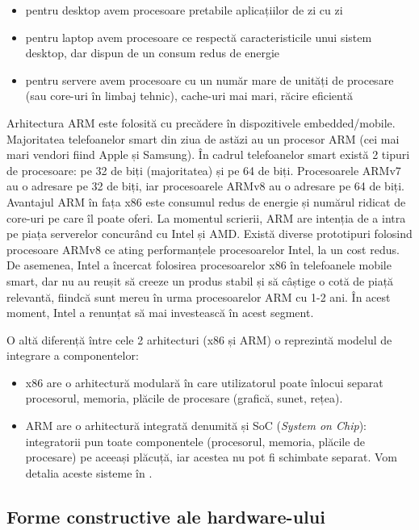\begin{itemize}
  \item pentru desktop avem procesoare pretabile aplicațiilor de zi cu zi
  \item pentru laptop avem procesoare ce respectă caracteristicile unui sistem desktop, dar dispun de un consum redus de energie
  \item pentru servere avem procesoare cu un număr mare de unități de procesare (sau core-uri în limbaj tehnic), cache-uri mai mari, răcire eficientă
\end{itemize}

Arhitectura ARM este folosită cu precădere în dispozitivele embedded/mobile.
Majoritatea telefoanelor smart din ziua de astăzi au un procesor ARM (cei mai mari vendori fiind Apple și Samsung).
În cadrul telefoanelor smart există 2 tipuri de procesoare: pe 32 de biți (majoritatea) și pe 64 de biți.
Procesoarele ARMv7 au o adresare pe 32 de biți, iar procesoarele ARMv8 au o adresare pe 64 de biți.
Avantajul ARM în fața x86 este consumul redus de energie și numărul ridicat de core-uri pe care îl poate oferi.
La momentul scrierii, ARM are intenția de a intra pe piața serverelor concurând cu Intel și AMD.
Există diverse prototipuri folosind procesoare ARMv8 ce ating performanțele procesoarelor Intel, la un cost redus.
De asemenea, Intel a încercat folosirea procesoarelor x86 în telefoanele mobile smart, dar nu au reușit să creeze un produs stabil și să câștige o cotă de piață relevantă, fiindcă sunt mereu în urma procesoarelor ARM cu 1-2 ani.
În acest moment, Intel a renunțat să mai investească în acest segment.

O altă diferență între cele 2 arhitecturi (x86 și ARM) o reprezintă modelul de integrare a componentelor:

\begin{itemize}
  \item x86 are o arhitectură modulară în care utilizatorul poate înlocui separat procesorul, memoria, plăcile de procesare (grafică, sunet, rețea).
  \item ARM are o arhitectură integrată denumită și SoC (\textit{System on Chip}): integratorii pun toate componentele (procesorul, memoria, plăcile de procesare) pe aceeași plăcuță, iar acestea nu pot fi schimbate separat.
    Vom detalia aceste sisteme în .
\end{itemize}

\subsection{Forme constructive ale hardware-ului}
\label{sec:hw:class:form}

